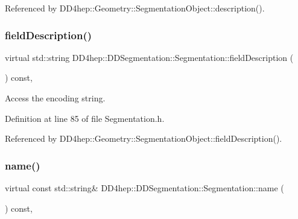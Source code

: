 Referenced by D\+D4hep\+::\+Geometry\+::\+Segmentation\+Object\+::description().

\hypertarget{class_d_d4hep_1_1_d_d_segmentation_1_1_segmentation_a45536a3376bac79c20e03a013ffb15be}{}\label{class_d_d4hep_1_1_d_d_segmentation_1_1_segmentation_a45536a3376bac79c20e03a013ffb15be} 
\subsubsection{\texorpdfstring{field\+Description()}{fieldDescription()}}
{\footnotesize\ttfamily virtual std\+::string D\+D4hep\+::\+D\+D\+Segmentation\+::\+Segmentation\+::field\+Description (\begin{DoxyParamCaption}{ }\end{DoxyParamCaption}) const\hspace{0.3cm}{\ttfamily [inline]}, {\ttfamily [virtual]}}



Access the encoding string. 



Definition at line 85 of file Segmentation.\+h.



Referenced by D\+D4hep\+::\+Geometry\+::\+Segmentation\+Object\+::field\+Description().

\hypertarget{class_d_d4hep_1_1_d_d_segmentation_1_1_segmentation_a8c2f56170b912ef5e5c380169939c56e}{}\label{class_d_d4hep_1_1_d_d_segmentation_1_1_segmentation_a8c2f56170b912ef5e5c380169939c56e} 
\subsubsection{\texorpdfstring{name()}{name()}}
{\footnotesize\ttfamily virtual const std\+::string\& D\+D4hep\+::\+D\+D\+Segmentation\+::\+Segmentation\+::name (\begin{DoxyParamCaption}{ }\end{DoxyParamCaption}) const\hspace{0.3cm}{\ttfamily [inline]}, {\ttfamily [virtual]}}




